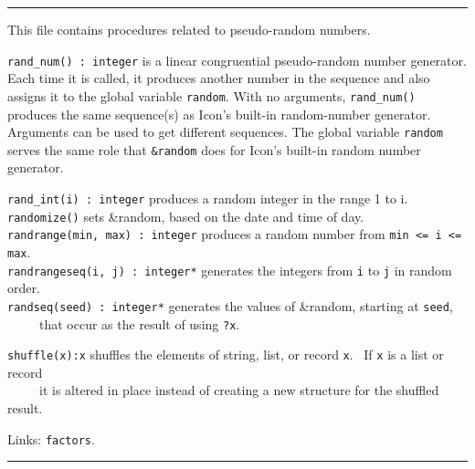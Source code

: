 
\vspace{0.25cm}\hrule{}

This file contains procedures related to pseudo-random numbers.

\texttt{rand\_num() : integer} is a linear congruential pseudo-random
number generator. Each time it is called, it produces
another number in the sequence and also assigns it to the global
variable \texttt{random}. With no arguments, \texttt{rand\_num()}
produces the same sequence(s) as Icon's built-in
random-number generator. Arguments can
be used to get different sequences. The global variable \texttt{random}
serves the same role that \texttt{\&random} does for
Icon's built-in random
number generator.

\texttt{rand\_int(i) : integer} produces a random integer in the range 1
to i.\\
\texttt{randomize()} sets \&random, based on the
date and time of day. \\
\texttt{randrange(min, max) : integer} produces a random number from
\texttt{min {\textless}= i {\textless}= max}.\\
\texttt{randrangeseq(i, j) : integer*} generates the integers from
\texttt{i} to \texttt{j} in random order.\\
\texttt{randseq(seed) : integer*} generates the values of \&random,
starting at \texttt{seed},\\
 \ \ \ \ \ that occur as the result of using \texttt{?x}.

\texttt{shuffle(x):x} shuffles the elements of string, list, or record
\texttt{x}. \ If \texttt{x} is a list or record\\
 \ \ \ \ \ it is altered in place instead of creating a new structure for
the shuffled result.

Links: \texttt{factors}.

\vspace{0.25cm}\hrule{}

